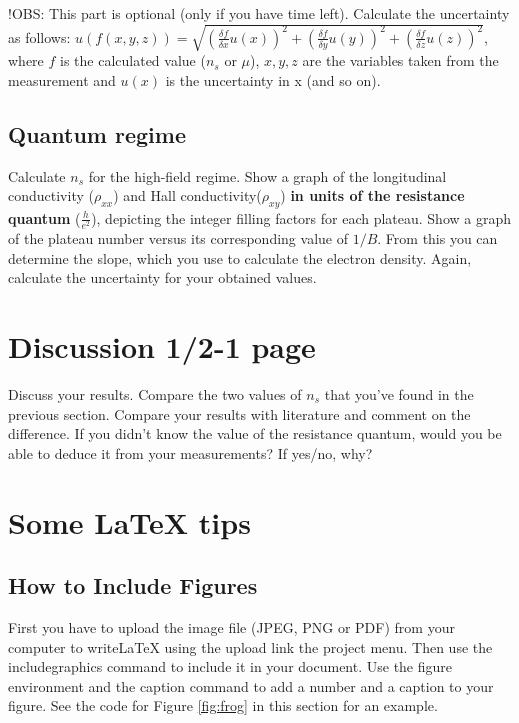 \documentclass[a4paper]{article}
\begin{document}
    !OBS: This part is optional (only if you have time left).
    Calculate the uncertainty as follows: \newline $u(f(x, y, z)) = \sqrt{(\frac{\delta f}{\delta{x}} u(x))^{2} + (\frac{\delta f}{\delta{y}} u(y))^{2} + (\frac{\delta f}{\delta{z}} u(z))^{2}}$, where $f$ is the calculated value ($n_{s}$ or $\mu$), $x, y, z$ are the variables taken from the measurement and $u(x)$ is the uncertainty in x (and so on).
    
    \subsection{Quantum regime}
    Calculate $n_{s}$ for the high-field regime.
    Show a graph of the longitudinal conductivity ($\rho_{xx}$) and Hall conductivity($\rho_{xy}$) \textbf{in units of the resistance quantum} ($\frac{h}{e^{2}}$), depicting the integer filling factors for each plateau.
    Show a graph of the plateau number versus its corresponding value of $1/B$. From this you can determine the slope, which you use to calculate the electron density.
    Again, calculate the uncertainty for your obtained values.
    
    \section{Discussion 1/2-1 page}
    Discuss your results. Compare the two values of $n_{s}$ that you've found in the previous section. Compare your results with literature and comment on the difference. If you didn't know the value of the resistance quantum, would you be able to deduce it from your measurements? If yes/no, why?
    
    \newpage
    \section{Some LaTeX tips}
    \label{sec:latex}
    \subsection{How to Include Figures}
    
    First you have to upload the image file (JPEG, PNG or PDF) from your computer to writeLaTeX using the upload link the project menu. Then use the includegraphics command to include it in your document. Use the figure environment and the caption command to add a number and a caption to your figure. See the code for Figure \ref{fig:frog} in this section for an example.
    
\end{document}
